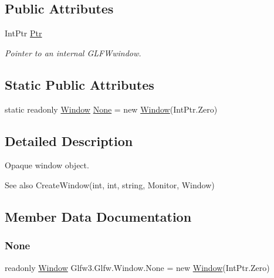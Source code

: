 \subsection*{Public Attributes}
\begin{DoxyCompactItemize}
\item 
Int\+Ptr \mbox{\hyperlink{struct_glfw3_1_1_glfw_1_1_window_a7430cab046e77307dd5c30f153b1d25e}{Ptr}}
\begin{DoxyCompactList}\small\item\em Pointer to an internal G\+L\+F\+Wwindow. \end{DoxyCompactList}\end{DoxyCompactItemize}
\subsection*{Static Public Attributes}
\begin{DoxyCompactItemize}
\item 
static readonly \mbox{\hyperlink{struct_glfw3_1_1_glfw_1_1_window}{Window}} \mbox{\hyperlink{struct_glfw3_1_1_glfw_1_1_window_adbd0a4231a59af9e5175f77c966e9ec8}{None}} = new \mbox{\hyperlink{struct_glfw3_1_1_glfw_1_1_window}{Window}}(Int\+Ptr.\+Zero)
\end{DoxyCompactItemize}


\subsection{Detailed Description}


Opaque window object.

\begin{DoxySeeAlso}{See also}
Create\+Window(int, int, string, Monitor, Window)


\end{DoxySeeAlso}


\subsection{Member Data Documentation}
\mbox{\label{struct_glfw3_1_1_glfw_1_1_window_adbd0a4231a59af9e5175f77c966e9ec8}} 
\subsubsection{\texorpdfstring{None}{None}}
{\footnotesize\ttfamily readonly \mbox{\hyperlink{struct_glfw3_1_1_glfw_1_1_window}{Window}} Glfw3.\+Glfw.\+Window.\+None = new \mbox{\hyperlink{struct_glfw3_1_1_glfw_1_1_window}{Window}}(Int\+Ptr.\+Zero)\hspace{0.3cm}{\ttfamily [static]}}





